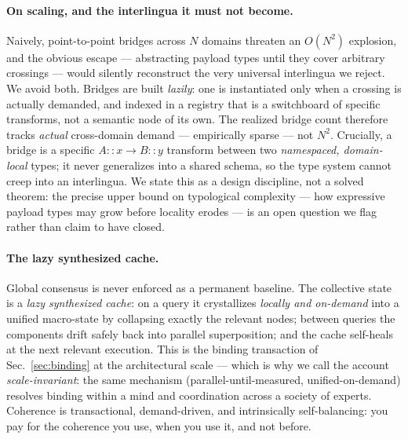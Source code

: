 \documentclass[11pt]{article}
\begin{document}
\paragraph{On scaling, and the interlingua it must not become.} Naively, point-to-point bridges across
$N$ domains threaten an $O(N^2)$ explosion, and the obvious escape --- abstracting payload types until
they cover arbitrary crossings --- would silently reconstruct the very universal interlingua we reject.
We avoid both. Bridges are built \emph{lazily}: one is instantiated only when a crossing is actually
demanded, and indexed in a registry that is a switchboard of specific transforms, not a semantic node
of its own. The realized bridge count therefore tracks \emph{actual} cross-domain demand --- empirically
sparse --- not $N^2$. Crucially, a bridge is a specific $A{:}{:}x \to B{:}{:}y$ transform between two
\emph{namespaced, domain-local} types; it never generalizes into a shared schema, so the type system
cannot creep into an interlingua. We state this as a design discipline, not a solved theorem: the precise
upper bound on typological complexity --- how expressive payload types may grow before locality erodes ---
is an open question we flag rather than claim to have closed.

\paragraph{The lazy synthesized cache.} Global consensus is never enforced as a permanent baseline. The
collective state is a \emph{lazy synthesized cache}: on a query it crystallizes \emph{locally and
on-demand} into a unified macro-state by collapsing exactly the relevant nodes; between queries the
components drift safely back into parallel superposition; and the cache self-heals at the next relevant
execution. This is the binding transaction of Sec.~\ref{sec:binding} at the architectural scale ---
which is why we call the account \emph{scale-invariant}: the same mechanism (parallel-until-measured,
unified-on-demand) resolves binding within a mind and coordination across a society of experts.
Coherence is transactional, demand-driven, and intrinsically self-balancing: you pay for the coherence
you use, when you use it, and not before.
\end{document}
